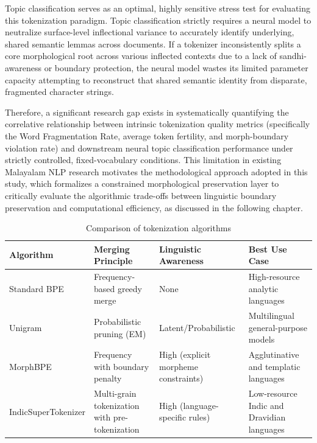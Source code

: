\documentclass[12pt]{article}
\begin{document}
Topic classification serves as an optimal, highly sensitive stress test for evaluating this tokenization paradigm. Topic classification strictly requires a neural model to neutralize surface-level inflectional variance to accurately identify underlying, shared semantic lemmas across documents. If a tokenizer inconsistently splits a core morphological root across various inflected contexts due to a lack of sandhi-awareness or boundary protection, the neural model wastes its limited parameter capacity attempting to reconstruct that shared semantic identity from disparate, fragmented character strings. 

Therefore, a significant research gap exists in systematically quantifying the correlative relationship between intrinsic tokenization quality metrics (specifically the Word Fragmentation Rate, average token fertility, and morph-boundary violation rate) and downstream neural topic classification performance under strictly controlled, fixed-vocabulary conditions. This limitation in existing Malayalam NLP research motivates the methodological approach adopted in this study, which formalizes a constrained morphological preservation layer to critically evaluate the algorithmic trade-offs between linguistic boundary preservation and computational efficiency, as discussed in the following chapter. 


\begin{table}[H]
\centering
\begin{tabularx}{\textwidth}{l X X X}
\toprule
\textbf{Algorithm} & \textbf{Merging Principle} & \textbf{Linguistic Awareness} & \textbf{Best Use Case} \\
\midrule

Standard BPE 
& Frequency-based greedy merge 
& None 
& High-resource analytic languages \\

Unigram 
& Probabilistic pruning (EM) 
& Latent/Probabilistic 
& Multilingual general-purpose models \\

MorphBPE 
& Frequency with boundary penalty 
& High (explicit morpheme constraints) 
& Agglutinative and templatic languages \\

IndicSuperTokenizer 
& Multi-grain tokenization with pre-tokenization 
& High (language-specific rules) 
& Low-resource Indic and Dravidian languages \\

\bottomrule
\end{tabularx}
\caption{Comparison of tokenization algorithms}
\end{table}
\end{document}
